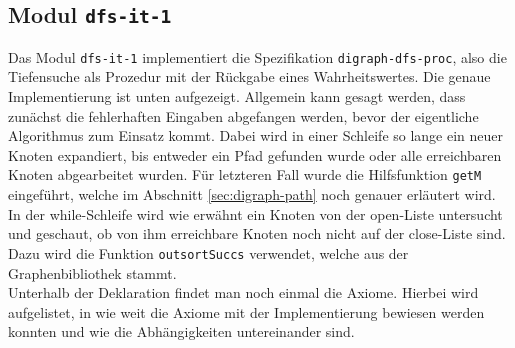 ﻿\subsection{Modul \texttt{dfs-it-1}}
\label{sec:dfs-it-1}

Das Modul \texttt{dfs-it-1} implementiert die Spezifikation \texttt{digraph-dfs-proc}, also die Tiefensuche als Prozedur mit der Rückgabe eines Wahrheitswertes. Die genaue Implementierung ist unten aufgezeigt. Allgemein kann gesagt werden, dass zunächst die fehlerhaften Eingaben abgefangen werden, bevor der eigentliche Algorithmus zum Einsatz kommt. Dabei wird in einer Schleife so lange ein neuer Knoten expandiert, bis entweder ein Pfad gefunden wurde oder alle erreichbaren Knoten abgearbeitet wurden. Für letzteren Fall wurde die Hilfsfunktion \texttt{getM} eingeführt, welche im Abschnitt \ref{sec:digraph-path} noch genauer erläutert wird. In der while-Schleife wird wie erwähnt ein Knoten von der open-Liste untersucht und geschaut, ob von ihm erreichbare Knoten noch nicht auf der close-Liste sind. Dazu wird die Funktion \texttt{outsortSuccs} verwendet, welche aus der Graphenbibliothek stammt.\\
Unterhalb der Deklaration findet man noch einmal die Axiome. Hierbei wird aufgelistet, in wie weit die Axiome mit der Implementierung bewiesen werden konnten und wie die Abhängigkeiten untereinander sind. 

